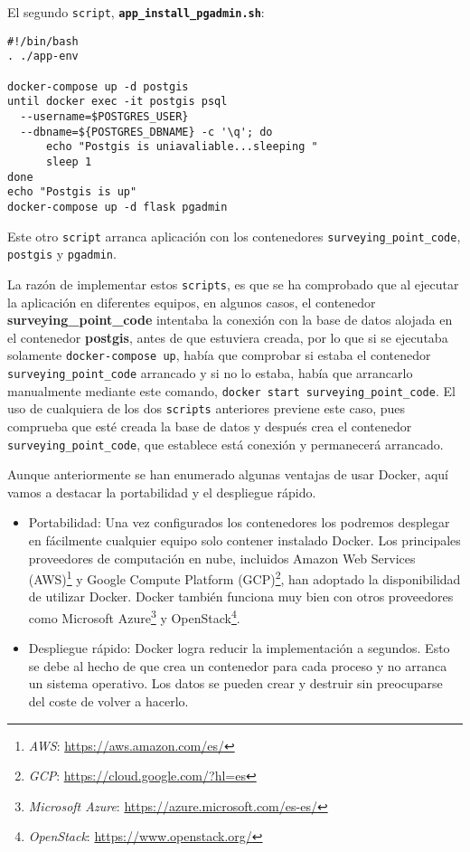 El segundo \texttt{script}, \textbf{\texttt{app\_install\_pgadmin.sh}}:

\begin{lstlisting}
#!/bin/bash
. ./app-env

docker-compose up -d postgis
until docker exec -it postgis psql
  --username=$POSTGRES_USER} 
  --dbname=${POSTGRES_DBNAME} -c '\q'; do
	  echo "Postgis is uniavaliable...sleeping "
      sleep 1
done
echo "Postgis is up"
docker-compose up -d flask pgadmin
\end{lstlisting}

Este otro \texttt{script} arranca aplicación con los contenedores \texttt{surveying\_point\_code}, \texttt{postgis} y \texttt{pgadmin}.

La razón de implementar estos \texttt{scripts}, es que se ha comprobado que al ejecutar la aplicación en diferentes equipos, en algunos casos, el contenedor \textbf{surveying\_point\_code} intentaba la conexión con la base de datos alojada en el contenedor \textbf{postgis}, antes de que estuviera creada, por lo que si se ejecutaba solamente \texttt{docker-compose up}, había que comprobar si estaba el contenedor 
\texttt{surveying\_point\_code} arrancado y si no lo estaba, había que arrancarlo manualmente mediante este comando, \texttt{docker start surveying\_point\_code}.  El uso de cualquiera de los dos \texttt{scripts} anteriores previene este caso, pues comprueba que esté creada la base de datos y después crea el contenedor \texttt{surveying\_point\_code}, que establece está conexión y permanecerá arrancado.

Aunque anteriormente se han enumerado algunas ventajas de usar Docker, aquí vamos 
a destacar la portabilidad y el despliegue rápido.
\begin{itemize}
\item Portabilidad: Una vez configurados los contenedores los podremos desplegar en fácilmente cualquier equipo solo contener instalado Docker. Los principales proveedores de computación en nube, incluidos Amazon Web Services (AWS)\footnote{\textsl{AWS}: \url{https://aws.amazon.com/es/}} y Google Compute Platform (GCP)\footnote{\textsl{GCP}: \url{https://cloud.google.com/?hl=es}}, han adoptado la disponibilidad de utilizar Docker. Docker también funciona muy bien con otros proveedores como Microsoft Azure\footnote{\textsl{Microsoft Azure}: \url{https://azure.microsoft.com/es-es/}} y OpenStack\footnote{\textsl{OpenStack}: \url{https://www.openstack.org/}}.
\item Despliegue rápido: Docker logra reducir la implementación a segundos. Esto se debe al hecho de que crea un contenedor para cada proceso y no arranca un sistema operativo. Los datos se pueden crear y destruir sin preocuparse del coste de volver a hacerlo.
\end{itemize}

